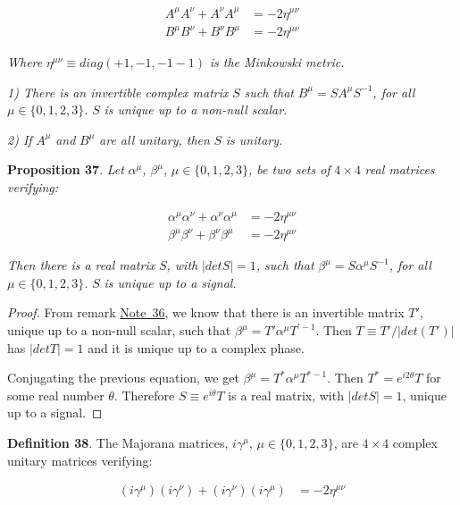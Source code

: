 \documentclass[11pt]{book}
\begin{document}
\begin{equation}\begin{aligned}
A^\mu A^\nu+A^\nu A^\mu&=-2\eta^{\mu\nu}\\
B^\mu B^\nu+B^\nu B^\mu&=-2\eta^{\mu\nu}\end{aligned}\end{equation}

\emph{ Where }\(\eta^{\mu\nu}\equiv diag(+1,-1,-1-1)\)\emph{ is the
Minkowski metric.}

\emph{1) There is an invertible complex matrix }\(S\)\emph{ such that
}\(B^\mu=S A^\mu S^{-1}\)\emph{, for all }\(\mu\in\{0,1,2,3\}\)\emph{.
}\(S\)\emph{ is unique up to a non-null scalar.}

\emph{2) If }\(A^\mu\)\emph{ and }\(B^\mu\)\emph{ are all unitary, then
}\(S\)\emph{ is unitary.}

\textbf{Proposition 37}. \emph{Let }\(\alpha^\mu\)\emph{,
}\(\beta^\mu\)\emph{, }\(\mu\in\{0,1,2,3\}\)\emph{, be two sets of
}\(4\times 4\)\emph{ real matrices verifying: }

\begin{equation}\begin{aligned}
\alpha^\mu\alpha^\nu+\alpha^\nu\alpha^\mu&=-2\eta^{\mu\nu}\\
\beta^\mu\beta^\nu+\beta^\nu\beta^\mu&=-2\eta^{\mu\nu}\end{aligned}\end{equation}

\emph{ Then there is a real matrix }\(S\)\emph{, with
}\(|det S|=1\)\emph{, such that }\(\beta^\mu=S\alpha^\mu S^{-1}\)\emph{,
for all }\(\mu\in\{0,1,2,3\}\)\emph{. }\(S\)\emph{ is unique up to a
signal.}

\emph{Proof.} From remark \protect\hyperlink{rem:fundamental}{Note~36},
we know that there is an invertible matrix \(T'\), unique up to a
non-null scalar, such that \(\beta^\mu=T'\alpha^\mu
T^{'-1}\). Then \(T\equiv T'/|det(T')|\) has \(|det T|=1\) and it is
unique up to a complex phase.

Conjugating the previous equation, we get \(\beta^\mu=T^*\alpha^\mu
T^{*-1}\). Then \(T^*=e^{i 2 \theta} T\) for some real number
\(\theta\). Therefore \(S\equiv e^{i \theta}T\) is a real matrix, with
\(|det S|=1\), unique up to a signal.~◻

\textbf{Definition 38}. The Majorana matrices, \(i\gamma^\mu\),
\(\mu\in\{0,1,2,3\}\), are \(4\times
4\) complex unitary matrices verifying:

\begin{equation}\begin{aligned}
(i\gamma^\mu)(i\gamma^\nu)+(i\gamma^\nu)(i\gamma^\mu)&=-2\eta^{\mu\nu}\end{aligned}\end{equation}
\end{document}
